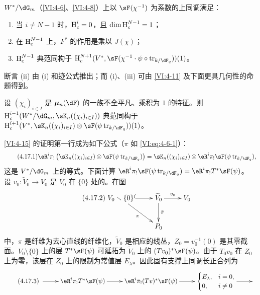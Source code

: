 \begin{proposition_}\label{VI:4-16}
$W^\ast/\dG_m$（\ref{VI:4-6}、\ref{VI:4-8}）上以 $\sF(\chi^{-1})$ 为系数的上同调满足：
\begin{enumerate}[\indent (i)]
\item 当 $i\ne N-1$ 时，$\operatorname{H}_c^i=0$，且 $\dim\operatorname{H}_c^{N-1}=1$；
\item 在 $\operatorname{H}_c^{N-1}$ 上，$F^\ast$ 的作用是乘以 $J(\chi)$；
\item $\operatorname{H}_c^{N-1}$ 典范同构于
$\h_c^{N+1}(V^\ast,\sF(\chi^{-1}\cdot\psi\circ\tr_{k/\dF_q}))(1)$。
\end{enumerate}
\end{proposition_}
断言 (ii) 由 (i) 和迹公式推出；而 (i)、(iii) 可由 \ref{VI:4-11} 及下面更具几何性的命题得到。

\begin{proposition_}\label{VI:4-17}
设 $(\chi_i)_{i\in I}$ 是 $\dmu_n(\dF)$ 的一族不全平凡、乘积为 $1$ 的特征。则
$\h_c^{i-1}(W^\ast/\dG_m,\sK_n((\chi_i)_{i\in I}))$
典范同构于
$\h_c^{i+1}(V^\ast,\sK_n((\chi_i)_{i\in I})\otimes\sF(\psi\tr_{k/\dF_q}))(1)$。
\end{proposition_}
\ref{VI:4-15} 的证明第一行成为如下公式（$\pi$ 如 \eqref{VI:eq:4-6-1}）：
\begin{equation*}\tag{4.17.1}\label{VI:eq:4-17-1}
\eR^i\pi_!\left(\sK_n((\chi_i)_{i\in I})\otimes\sF(\psi\tr_{k/\dF_q})\right)
=\sK_n((\chi_i)_{i\in I})\otimes\eR^i\pi_!\sF(\psi\tr_{k/\dF_q}),
\end{equation*}
这是 $V^\ast/\dG_m$ 上的等式。下面计算
$\eR^i\pi_!\sF(\psi\tr_{k/\dF_q})=\eR^i\pi_!T^\ast\sF(\psi)$。
设 $v_0:\widetilde V_0\to V_0$ 是 $V_0$ 在 $\{0\}$ 处的。在图
\begin{equation*}\tag{4.17.2}\label{VI:eq:4-17-2}
\xymatrix{
 V_0\setminus\{0\}\ar@{^{(}->}[r]\ar[dr]_-\pi&\widetilde V_0\ar[r]^-{v_0}\ar[d]^-{\bar\pi}&V_0\\
 &P_0
}
\end{equation*}
中，$\pi$ 是纤维为去心直线的纤维化，$\widetilde V_0$ 是相应的线丛，$Z_0=v_0^{-1}(0)$ 是其零截面。$V_0\setminus\{0\}$ 上的层 $T^\ast\sF(\psi)$ 可延拓为 $\widetilde V_0$ 上的 $(Tv_0)^\ast\sF(\psi)$。由于 $T_0v_0$ 在 $Z_0$ 上为零，该层在 $Z_0$ 上的限制为常值层 $E_\lambda$。因此固有支撑上同调长正合列为
\begin{equation*}\tag{4.17.3}\label{VI:eq:4-17-3}
\xymatrix{
\ar[r]&\eR^i\pi_!T^\ast\sF(\psi)\ar[r]&\eR^i\bar\pi_!(Tv)^\ast\sF(\psi)\ar[r]&
 {\begin{cases}E_\lambda,&i=0,\\0,&i\ne0\end{cases}}\ar[r]&
}
\end{equation*}
